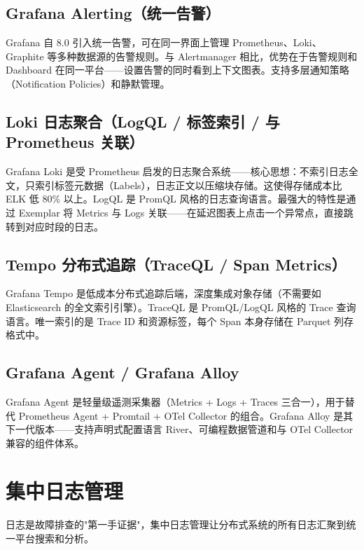 \documentclass[12pt,UTF8]{ctexbook}
\begin{document}
  \section{Grafana Alerting（统一告警）}

Grafana 自 8.0 引入统一告警，可在同一界面上管理 Prometheus、Loki、Graphite 等多种数据源的告警规则。与 Alertmanager 相比，优势在于告警规则和 Dashboard 在同一平台——设置告警的同时看到上下文图表。支持多层通知策略（Notification Policies）和静默管理。

  \section{Loki 日志聚合（LogQL / 标签索引 / 与 Prometheus 关联）}

Grafana Loki 是受 Prometheus 启发的日志聚合系统——核心思想：不索引日志全文，只索引标签元数据（Labels），日志正文以压缩块存储。这使得存储成本比 ELK 低 80\% 以上。LogQL 是 PromQL 风格的日志查询语言。最强大的特性是通过 Exemplar 将 Metrics 与 Logs 关联——在延迟图表上点击一个异常点，直接跳转到对应时段的日志。

  \section{Tempo 分布式追踪（TraceQL / Span Metrics）}

Grafana Tempo 是低成本分布式追踪后端，深度集成对象存储（不需要如 Elasticsearch 的全文索引引擎）。TraceQL 是 PromQL/LogQL 风格的 Trace 查询语言。唯一索引的是 Trace ID 和资源标签，每个 Span 本身存储在 Parquet 列存格式中。

  \section{Grafana Agent / Grafana Alloy}

Grafana Agent 是轻量级遥测采集器（Metrics + Logs + Traces 三合一），用于替代 Prometheus Agent + Promtail + OTel Collector 的组合。Grafana Alloy 是其下一代版本——支持声明式配置语言 River、可编程数据管道和与 OTel Collector 兼容的组件体系。

\chapter{集中日志管理}
\label{chap:centralized-logging}

日志是故障排查的"第一手证据"，集中日志管理让分布式系统的所有日志汇聚到统一平台搜索和分析。
\end{document}
